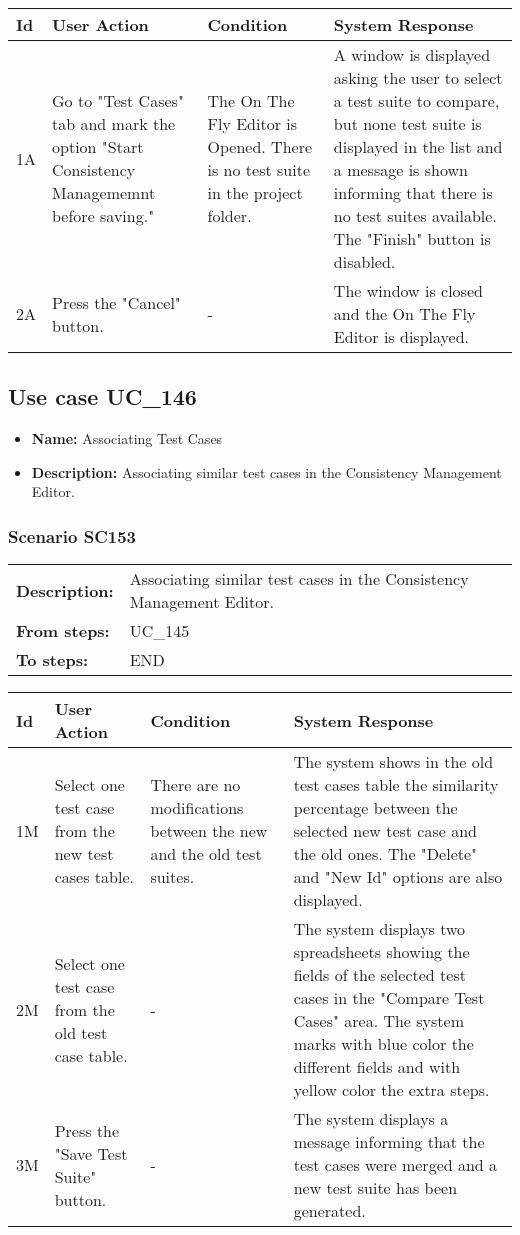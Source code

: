\documentclass[a4paper,11pt]{article}
\newcommand{\bl}{\\ \hline}
\begin{document}
\begin{tabular}{|p{0.8in}|p{1.6in}|p{1.6in}|p{1.6in}|}
\hline
Id & User Action & Condition & System Response  \bl 
1A & Go to "Test Cases" tab and mark the option "Start
						Consistency Managememnt before saving." & The On The Fly Editor is Opened. There is no test suite
						in the project folder. & A window is displayed asking the user to select a test
						suite to compare, but none test suite is displayed in the list and
						a message is shown informing that there is no test suites
						available. The "Finish" button is disabled.  \bl 
2A & Press the "Cancel" button. & - & The window is closed and the On The Fly Editor is
						displayed. \bl 
\end{tabular}
\subsection*{Use case UC_146}
\begin{itemize}
\item {\bf Name: }Associating Test Cases
\item {\bf Description: }Associating similar test cases in the Consistency
				Management Editor.
\end{itemize}
\subsubsection*{Scenario SC153}
\begin{tabular}{p{1in}p{4in}}
{\bf Description:} & Associating similar test cases in the Consistency
					Management Editor. \\
{\bf From steps:} & UC_145#2M \\
{\bf To steps:} & END \\
\end{tabular}
 
\begin{tabular}{|p{0.8in}|p{1.6in}|p{1.6in}|p{1.6in}|}
\hline
Id & User Action & Condition & System Response  \bl 
1M & Select one test case from the new test cases table.
					 & There are no modifications between the new and the old
						test suites. & The system shows in the old test cases table the
						similarity percentage between the selected new test case and the
						old ones. The "Delete" and "New Id" options are also displayed.
					 \bl 
2M & Select one test case from the old test case table. & - & The system displays two spreadsheets showing the fields
						of the selected test cases in the "Compare Test Cases" area. The
						system marks with blue color the different fields and with yellow
						color the extra steps. \bl 
3M & Press the "Save Test Suite" button. & - & The system displays a message informing that the test
						cases were merged and a new test suite has been generated.
					 \bl 
\end{tabular}
\end{document}
